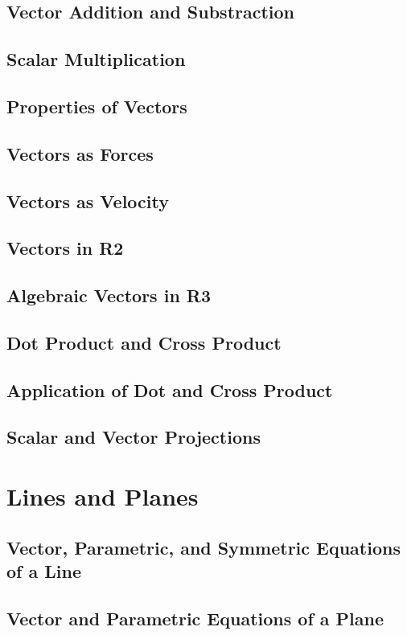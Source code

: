 \documentclass[12.5pt]{article}
\begin{document}
        \clearpage
        \subsection{Vector Addition and Substraction}
        \subsection{Scalar Multiplication}
        \subsection{Properties of Vectors}
        \subsection{Vectors as Forces}
        \subsection{Vectors as Velocity}
        \subsection{Vectors in R2}
        \subsection{Algebraic Vectors in R3}
        \subsection{Dot Product and Cross Product}
        \subsection{Application of Dot and Cross Product}
        \subsection{Scalar and Vector Projections}

    \section{Lines and Planes}
        \subsection{Vector, Parametric, and Symmetric Equations of a Line}
        \subsection{Vector and Parametric Equations of a Plane}
\end{document}
